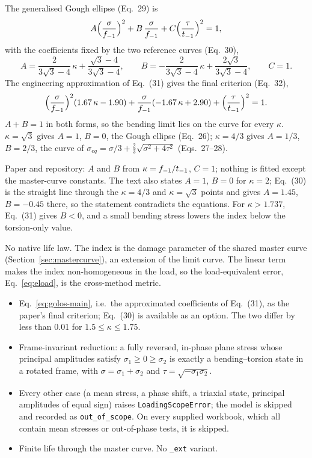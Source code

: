  The generalised Gough ellipse (Eq.~29) is
\begin{equation}
A\Bigl(\frac{\sigma}{f_{-1}}\Bigr)^2 + B\,\frac{\sigma}{f_{-1}} + C\Bigl(\frac{\tau}{t_{-1}}\Bigr)^2 = 1 ,
\label{eq:golos-29}
\end{equation}
with the coefficients fixed by the two reference curves (Eq.~30),
\begin{equation}
A = \frac{2}{3\sqrt3-4}\,\kappa + \frac{\sqrt3-4}{3\sqrt3-4} , \qquad
B = -\frac{2}{3\sqrt3-4}\,\kappa + \frac{2\sqrt3}{3\sqrt3-4} , \qquad C = 1 .
\label{eq:golos-30}
\end{equation}
The engineering approximation of Eq.~(31) gives the final criterion (Eq.~32),
\begin{equation}
\Bigl(\frac{\sigma}{f_{-1}}\Bigr)^2(1.67\,\kappa - 1.90) + \frac{\sigma}{f_{-1}}(-1.67\,\kappa + 2.90)
+ \Bigl(\frac{\tau}{t_{-1}}\Bigr)^2 = 1 .
\label{eq:golos-main}
\end{equation}
$A+B=1$ in both forms, so the bending limit lies on the curve for every $\kappa$. $\kappa=\sqrt3$ gives
$A=1$, $B=0$, the Gough ellipse (Eq.~26); $\kappa=4/3$ gives $A=1/3$, $B=2/3$, the curve of
$\sigma_{eq}=\sigma/3+\tfrac23\sqrt{\sigma^2+4\tau^2}$ (Eqs.~27--28).

 Paper and repository: $A$ and $B$ from $\kappa=f_{-1}/t_{-1}$, $C=1$; nothing
is fitted except the master-curve constants. The text also states $A=1$, $B=0$ for $\kappa=2$; Eq.~(30)
is the straight line through the $\kappa=4/3$ and $\kappa=\sqrt3$ points and gives $A=1.45$, $B=-0.45$
there, so the statement contradicts the equations. For $\kappa>1.737$, Eq.~(31) gives $B<0$, and a
small bending stress lowers the index below the torsion-only value.

 No native life law. The index is the damage parameter of the shared master curve
(Section~\ref{sec:mastercurve}), an extension of the limit curve. The linear term makes the index
non-homogeneous in the load, so the load-equivalent error, Eq.~\eqref{eq:eload}, is the cross-method
metric.

\begin{itemize}
\item Eq.~\eqref{eq:golos-main}, i.e.\ the approximated coefficients of Eq.~(31), as the paper's final
  criterion; Eq.~(30) is available as an option. The two differ by less than 0.01 for
  $1.5\le\kappa\le1.75$.
\item Frame-invariant reduction: a fully reversed, in-phase plane stress whose principal amplitudes
  satisfy $\sigma_1\ge0\ge\sigma_2$ is exactly a bending--torsion state in a rotated frame, with
  $\sigma=\sigma_1+\sigma_2$ and $\tau=\sqrt{-\sigma_1\sigma_2}$.
\item Every other case (a mean stress, a phase shift, a triaxial state, principal amplitudes of equal
  sign) raises \texttt{LoadingScopeError}; the model is skipped and recorded as \texttt{out\_of\_scope}.
  On every supplied workbook, which all contain mean stresses or out-of-phase tests, it is skipped.
\item Finite life through the master curve. No \texttt{\_ext} variant.
\end{itemize}


